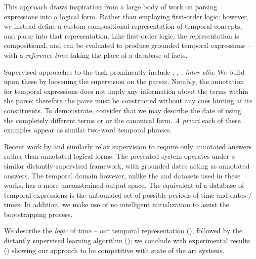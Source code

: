 This approach draws inspiration from a large body of work
	on parsing expressions into a logical form.
Rather than employing first-order logic; however,
	we instead define a custom compositional representation of temporal
	concepts, and parse into that representation.
Like first-order logic, the representation is compositional, and can be
	evaluated to produce grounded temporal expressions
	-- with a \textit{reference time} taking the place of a database 
	of facts.

Supervised approaches to the task prominently include
	,
	,
	, 
	\textit{inter alia}.
We build upon these by loosening the supervision on the parses.
Notably, the annotation for temporal expressions does not imply any information
	about the terms within the parse; therefore the parse must be constructed
	without any cues hinting at its constituents.
To demonstrate, consider that we may describe the date of 
	using the completely different terms  or  or the canonical \tp{[month] [day]} form.
\textit{A priori} each of these examples appear as similar two-word
	temporal phrases.

Recent work by  and 
	 similarly relax supervision 
	to require only annotated answers rather than annotated logical forms.
The presented system operates under a similar distantly-supervised framework,
	with grounded dates acting as annotated answers.
The temporal domain however, unlike the  and 
	datasets used in these works, has a more unconstrained output space.
The equivalent of a database of temporal expressions is the
	unbounded set of possible periods of time and dates / times.
In addition, we  make use of no intelligent
	initialization to assist the bootstrapping process.

We describe the \textit{logic} of time -- our temporal representation
	(), followed by the distantly supervised learning algorithm
	(); we conclude with experimental results 
	() showing our
	approach to be competitive with state of the art systems.
